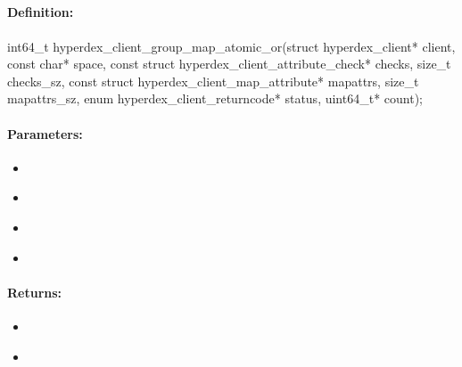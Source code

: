\pagebreak
\subsection{}
\label{api:c:group_map_atomic_or}


\paragraph{Definition:}
\begin{ccode}
int64_t hyperdex_client_group_map_atomic_or(struct hyperdex_client* client,
        const char* space,
        const struct hyperdex_client_attribute_check* checks, size_t checks_sz,
        const struct hyperdex_client_map_attribute* mapattrs, size_t mapattrs_sz,
        enum hyperdex_client_returncode* status,
        uint64_t* count);
\end{ccode}

\paragraph{Parameters:}
\begin{itemize}[noitemsep]
\item {}\\

\item {}\\

\item {}\\

\item {}\\

\end{itemize}

\paragraph{Returns:}
\begin{itemize}[noitemsep]
\item {}\\

\item {}\\

\end{itemize}

